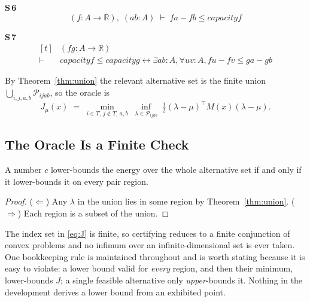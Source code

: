 \noindent\textbf{S\,6}\quad{}
{\footnotesize\[ (\mathit{f} : \mathit{A} \to \mathbb{R} ),\; (\mathit{a} \mathit{b} : \mathit{A}) \;\vdash\; \mathit{f} \mathit{a} - \mathit{f} \mathit{b} \leq \mathit{capacity} \mathit{f} \]}

\noindent\textbf{S\,7}\quad{}
{\footnotesize\[ \begin{aligned}[t]
&(\mathit{f} \mathit{g} : \mathit{A} \to \mathbb{R} )\\
\vdash\;&\mathit{capacity} \mathit{f} \leq \mathit{capacity} \mathit{g} \leftrightarrow \exists \mathit{a} \mathit{b} : \mathit{A}, \forall \mathit{u} \mathit{v} : \mathit{A}, \mathit{f} \mathit{u} - \mathit{f} \mathit{v} \leq \mathit{g} \mathit{a} - \mathit{g} \mathit{b}
\end{aligned} \]}


By Theorem~\ref{thm:union} the relevant alternative set is the finite union
$\bigcup_{i,j,a,b}\mathcal{P}_{ijab}$, so the oracle is
\begin{equation}
J_\mu(x)\;=\;\min_{i\in T,\,j\notin T,\,a,b}\;
\inf_{\lambda\in\mathcal{P}_{ijab}}\;
\tfrac{1}{2}(\lambda-\mu)^{\top}M(x)(\lambda-\mu).
\label{eq:J}
\end{equation}

\subsection{The Oracle Is a Finite Check}
\label{sec:oracle}

\begin{theorem}
\label{thm:oracle}
A number $c$ lower-bounds the energy over the whole alternative set if and only if it
lower-bounds it on every pair region.
\end{theorem}

\begin{proof}
($\Leftarrow$) Any $\lambda$ in the union lies in some region by Theorem~\ref{thm:union}.
($\Rightarrow$) Each region is a subset of the union.
\end{proof}


The index set in \eqref{eq:J} is finite, so certifying reduces to a finite conjunction of
convex problems and no infimum over an infinite-dimensional set is ever taken. One
bookkeeping rule is maintained throughout and is worth stating because it is easy to violate:
a lower bound valid for \emph{every} region, and then their minimum, lower-bounds $J$; a
single feasible alternative only \emph{upper}-bounds it. Nothing in the development derives a
lower bound from an exhibited point.

